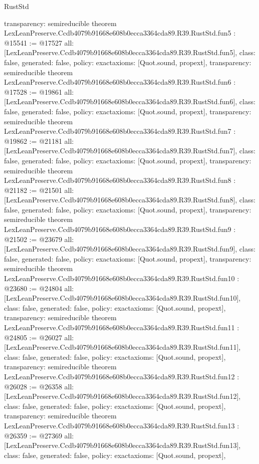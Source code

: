 \begin{lexlean}{RustStd}
\begin{coremodule}
{  transparency: semireducible
}
theorem LexLeanPreserve.Ccdb4079b91668e608b0ecca3364cda89.R39.RustStd.fun5 : @15541 := @17527 {
  all: [LexLeanPreserve.Ccdb4079b91668e608b0ecca3364cda89.R39.RustStd.fun5],
  class: false,
  generated: false,
  policy: exact{axioms: [Quot.sound, propext]},
  transparency: semireducible
}
theorem LexLeanPreserve.Ccdb4079b91668e608b0ecca3364cda89.R39.RustStd.fun6 : @17528 := @19861 {
  all: [LexLeanPreserve.Ccdb4079b91668e608b0ecca3364cda89.R39.RustStd.fun6],
  class: false,
  generated: false,
  policy: exact{axioms: [Quot.sound, propext]},
  transparency: semireducible
}
theorem LexLeanPreserve.Ccdb4079b91668e608b0ecca3364cda89.R39.RustStd.fun7 : @19862 := @21181 {
  all: [LexLeanPreserve.Ccdb4079b91668e608b0ecca3364cda89.R39.RustStd.fun7],
  class: false,
  generated: false,
  policy: exact{axioms: [Quot.sound, propext]},
  transparency: semireducible
}
theorem LexLeanPreserve.Ccdb4079b91668e608b0ecca3364cda89.R39.RustStd.fun8 : @21182 := @21501 {
  all: [LexLeanPreserve.Ccdb4079b91668e608b0ecca3364cda89.R39.RustStd.fun8],
  class: false,
  generated: false,
  policy: exact{axioms: [Quot.sound, propext]},
  transparency: semireducible
}
theorem LexLeanPreserve.Ccdb4079b91668e608b0ecca3364cda89.R39.RustStd.fun9 : @21502 := @23679 {
  all: [LexLeanPreserve.Ccdb4079b91668e608b0ecca3364cda89.R39.RustStd.fun9],
  class: false,
  generated: false,
  policy: exact{axioms: [Quot.sound, propext]},
  transparency: semireducible
}
theorem LexLeanPreserve.Ccdb4079b91668e608b0ecca3364cda89.R39.RustStd.fun10 : @23680 := @24804 {
  all: [LexLeanPreserve.Ccdb4079b91668e608b0ecca3364cda89.R39.RustStd.fun10],
  class: false,
  generated: false,
  policy: exact{axioms: [Quot.sound, propext]},
  transparency: semireducible
}
theorem LexLeanPreserve.Ccdb4079b91668e608b0ecca3364cda89.R39.RustStd.fun11 : @24805 := @26027 {
  all: [LexLeanPreserve.Ccdb4079b91668e608b0ecca3364cda89.R39.RustStd.fun11],
  class: false,
  generated: false,
  policy: exact{axioms: [Quot.sound, propext]},
  transparency: semireducible
}
theorem LexLeanPreserve.Ccdb4079b91668e608b0ecca3364cda89.R39.RustStd.fun12 : @26028 := @26358 {
  all: [LexLeanPreserve.Ccdb4079b91668e608b0ecca3364cda89.R39.RustStd.fun12],
  class: false,
  generated: false,
  policy: exact{axioms: [Quot.sound, propext]},
  transparency: semireducible
}
theorem LexLeanPreserve.Ccdb4079b91668e608b0ecca3364cda89.R39.RustStd.fun13 : @26359 := @27369 {
  all: [LexLeanPreserve.Ccdb4079b91668e608b0ecca3364cda89.R39.RustStd.fun13],
  class: false,
  generated: false,
  policy: exact{axioms: [Quot.sound, propext]},
}
\end{coremodule}
\end{lexlean}
